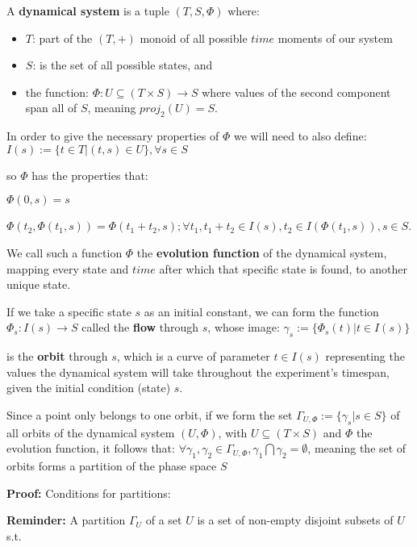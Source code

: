 \begin{definition}
  A \textbf{dynamical system} is a tuple $(T,S,\Phi)$ where:

  \begin{itemize}
    \item $T$: part of the $(T,+)$ monoid of all possible $time$ moments of our system
    \item $S$: is the set of all possible states, and
    \item the function: $\Phi : U \subseteq (T \times S ) \rightarrow S$ where values of the second component span all of $S$, meaning $proj_2(U) = S$.
  \end{itemize}
  In order to give the necessary properties of $\Phi$ we will need to also define:
  $I(s):= \{ t \in T | (t,s) \in U \}, \forall s \in S$

  so $\Phi$ has the properties that:

  $\Phi(0,s) = s$

  $\Phi(t_2,\Phi(t_1,s)) = \Phi(t_1+t_2,s); \forall t_1, t_1+t_2 \in I(s), t_2 \in I(\Phi(t_1,s)), s \in S$.

  We call such a function $\Phi$ the \textbf{evolution function} of the dynamical system, mapping every state and $time$ after which that specific state is found, to another unique state.
\end{definition}

If we take a specific state $s$ as an initial constant, we can form the function
$\Phi_s : I(s) \rightarrow S$
called the \textbf{flow} through $s$, whose image:
$\gamma_s:=\{\Phi_s(t) | t\in I(s) \}$

is the \textbf{orbit} through $s$,
which is a curve of parameter $t \in I(s)$ representing the values the dynamical system will take throughout the experiment's timespan, given the initial condition (state) $s$.

Since a point only belongs to one orbit, if we form the set
$\Gamma_{U,\Phi}:=\{ \gamma_s | s \in S \}$
of all orbits of the dynamical system $(U,\Phi)$, with $U\subseteq (T \times S)$ and $\Phi$ the evolution function, it follows that:
$\forall \gamma_1,\gamma_2 \in \Gamma_{U, \Phi}, \gamma_1 \bigcap \gamma_2 = \emptyset$, meaning the set of orbits forms a partition of the phase space $S$

\textbf{Proof:}
Conditions for partitions:
\par \textbf{Reminder:} A partition $\Gamma_U$ of a set $U$ is a set of non-empty disjoint subsets of $U$ s.t.

